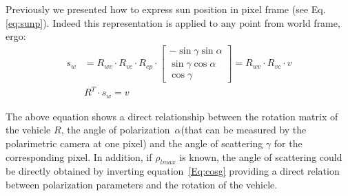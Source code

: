 Previously we presented how to express sun position in pixel frame (see
Eq.\,\eqref{eq:sunp}). Indeed this representation is applied to any point from
world frame, ergo:
\begin{equation}
  \label{eq:Rwv}
  \begin{split}
    s_{w} & = R_{wv} \cdot R_{vc} \cdot R_{cp} \cdot
    \begin{bmatrix}
    -\sin\gamma \sin\alpha\\
    \sin\gamma \cos\alpha\\
    \cos\gamma
  \end{bmatrix} = R_{wv} \cdot R_{vc} \cdot v\\
    & R^{T} \cdot s_{w}  = v
  \end{split}
\end{equation}

The above equation shows a direct relationship between the rotation matrix of the vehicle $R$,
the angle of polarization~$\alpha$(that can be measured by the polarimetric camera at one pixel) and the
angle of scattering $\gamma$ for the corresponding pixel. In addition, if $\rho_{lmax}$ is known,
the angle of scattering could be directly obtained by inverting equation~\ref{Eq:cosg} providing a direct relation
between polarization parameters and the rotation of the vehicle.

